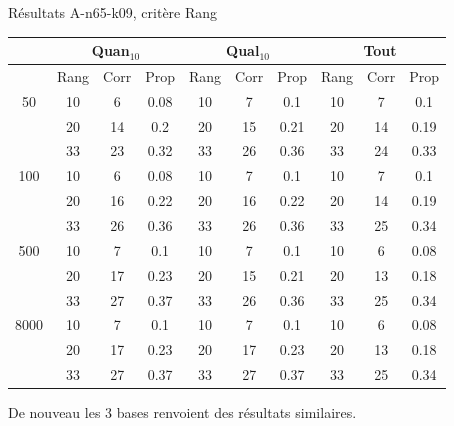 \documentclass{beamer}
\begin{document}
\begin{frame}{Résultats A-n65-k09, critère Rang}
\begin{table}[H]

\begin{tabular}{|@{}c@{}|@{}c@{}|@{}c@{}|@{}c@{}||@{}c@{}|@{}c@{}|@{}c@{}||@{}c@{}|@{}c@{}|@{}c@{}|}

\hline
 & \multicolumn{3}{c|}{Quan$_{10}$} & \multicolumn{3}{c|}{Qual$_{10}$} & \multicolumn{3}{c|}{Tout} \\
 \hline
 & Rang & Corr & Prop & Rang & Corr & Prop & Rang & Corr & Prop \\
 \hline
 50 & 10  & 6 & 0.08 & 10  & 7 & 0.1 & 10  & 7 & 0.1  \\
 \cline{2-10} 
    & 20 & 14 & 0.2 & 20  & 15 & 0.21 & 20  & 14 & 0.19  \\
 \cline{2-10} 
    & 33 & 23 & 0.32 & 33 & 26 & 0.36 & 33 & 24 & 0.33  \\
  \hline
   100 & 10  & 6 & 0.08 & 10  & 7 & 0.1 & 10  & 7 & 0.1  \\
 \cline{2-10} 
    & 20 & 16 & 0.22 & 20 & 16 & 0.22 & 20 & 14 & 0.19  \\
  \cline{2-10} 
    & 33 & 26 & 0.36 & 33 & 26 & 0.36 & 33 & 25 & 0.34  \\
  \hline
   500 & 10  & 7 & 0.1 & 10  & 7 & 0.1 & 10  & 6 & 0.08  \\
 \cline{2-10} 
    & 20 & 17 & 0.23 & 20 & 15 & 0.21 & 20 & 13 & 0.18  \\
  \cline{2-10} 
    & 33 & 27 & 0.37 & 33 & 26 & 0.36 & 33 & 25 & 0.34  \\
  \hline
   8000 & 10 & 7 & 0.1 & 10 & 7 & 0.1 & 10 & 6 & 0.08  \\
 \cline{2-10} 
    & 20 & 17 & 0.23 & 20 & 17 & 0.23 & 20 & 13 & 0.18  \\
  \cline{2-10} 
    & 33 & 27 & 0.37 & 33 & 27 & 0.37 & 33 & 25 & 0.34  \\
  \hline

\end{tabular}
\end{table}

De nouveau les 3 bases renvoient des résultats similaires. 
\end{frame}
\end{document}
